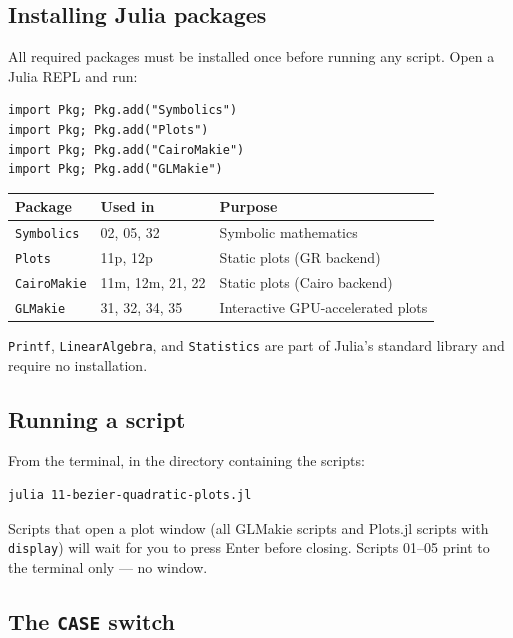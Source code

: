\documentclass[12pt, a4paper]{article}
\newcommand{\cd}[1]{\texttt{#1}}
\begin{document}
\subsection{Installing Julia packages}

All required packages must be installed once before
running any script.
Open a Julia REPL and run:

\begin{verbatim}
import Pkg; Pkg.add("Symbolics")
import Pkg; Pkg.add("Plots")
import Pkg; Pkg.add("CairoMakie")
import Pkg; Pkg.add("GLMakie")
\end{verbatim}

\begin{center}
\begin{tabular}{lll}
\toprule
Package & Used in & Purpose \\
\midrule
\cd{Symbolics} & 02, 05, 32 & Symbolic mathematics \\
\cd{Plots} & 11p, 12p & Static plots (GR backend) \\
\cd{CairoMakie} & 11m, 12m, 21, 22 & Static plots (Cairo backend) \\
\cd{GLMakie} & 31, 32, 34, 35 & Interactive GPU-accelerated plots \\
\bottomrule
\end{tabular}
\end{center}

\cd{Printf}, \cd{LinearAlgebra}, and \cd{Statistics}
are part of Julia's standard library and require no
installation.

\subsection{Running a script}

From the terminal, in the directory containing the scripts:

\begin{verbatim}
julia 11-bezier-quadratic-plots.jl
\end{verbatim}

Scripts that open a plot window (all GLMakie scripts and
Plots.jl scripts with \cd{display}) will wait for
you to press Enter before closing.
Scripts 01--05 print to the terminal only --- no window.

\subsection{The \texttt{CASE} switch}
\end{document}
